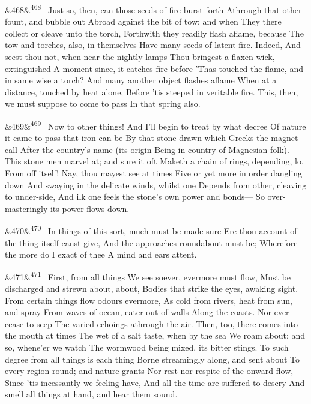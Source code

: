 \documentclass[12pt]{article}
\newcommand{\para}[1][]{\par\noindent\ifx&#1&\else\textsuperscript{\footnotesize #1}~\fi}
\begin{document}
\para[468] Just so, then, can those seeds of fire burst forth Athrough that other fount, and bubble out Abroad against the bit of tow; and when They there collect or cleave unto the torch, Forthwith they readily flash aflame, because The tow and torches, also, in themselves Have many seeds of latent fire. Indeed, And seest thou not, when near the nightly lamps Thou bringest a flaxen wick, extinguished A moment since, it catches fire before 'Thas touched the flame, and in same wise a torch? And many another object flashes aflame When at a distance, touched by heat alone, Before 'tis steeped in veritable fire. This, then, we must suppose to come to pass In that spring also.

\para[469] Now to other things! And I'll begin to treat by what decree Of nature it came to pass that iron can be By that stone drawn which Greeks the magnet call After the country's name (its origin Being in country of Magnesian folk). This stone men marvel at; and sure it oft Maketh a chain of rings, depending, lo, From off itself! Nay, thou mayest see at times Five or yet more in order dangling down And swaying in the delicate winds, whilst one Depends from other, cleaving to under-side, And ilk one feels the stone's own power and bonds--- So over-masteringly its power flows down.

\para[470] In things of this sort, much must be made sure Ere thou account of the thing itself canst give, And the approaches roundabout must be; Wherefore the more do I exact of thee A mind and ears attent.

\para[471] First, from all things We see soever, evermore must flow, Must be discharged and strewn about, about, Bodies that strike the eyes, awaking sight. From certain things flow odours evermore, As cold from rivers, heat from sun, and spray From waves of ocean, eater-out of walls Along the coasts. Nor ever cease to seep The varied echoings athrough the air. Then, too, there comes into the mouth at times The wet of a salt taste, when by the sea We roam about; and so, whene'er we watch The wormwood being mixed, its bitter stings. To such degree from all things is each thing Borne streamingly along, and sent about To every region round; and nature grants Nor rest nor respite of the onward flow, Since 'tis incessantly we feeling have, And all the time are suffered to descry And smell all things at hand, and hear them sound.
\end{document}
